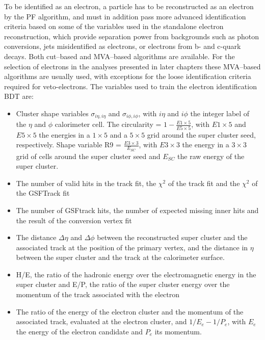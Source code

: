 To be identified as an electron, a particle has to be reconstructed as
an electron by the \ac{PF} algorithm, and must in addition pass
more advanced identification criteria based on some of the variables used in the
standalone electron reconstruction, which provide separation power from backgrounds
such as photon conversions, jets misidentified as electrons, or electrons from b- and c-quark
decays. Both cut--based and MVA--based algorithms are available. For the selection of electrons in 
the analyses presented in later chapters these MVA--based algorithms are usually used, 
with exceptions for the loose identification criteria required for veto-electrons. 
The variables used to train the electron identification BDT are:

\begin{itemize}
\setlength{\itemsep}{-\baselineskip}
\item Cluster shape variables $\sigma_{i\eta,i\eta}$ and $\sigma_{i\phi,i\phi}$, with $i\eta$ and $i\phi$ the integer
label of the $\eta$ and $\phi$ calorimeter cell. The circularity =  $1 -\frac{E1\times5}{E5\times5}$, with
$E1\times5$ and $E5\times5$ the energies in a $1\times5$ and a $5\times5$ grid around the super cluster seed,
respectively. Shape variable R9 = $\frac{E3\times3}{E_{SC}}$, with $E3\times3$ the energy in a $3\times3$ grid
of cells around the super cluster seed and $E_{SC}$ the raw energy of the super cluster.
\item The number of valid hits in the track fit, the $\chi^2$ of the track fit and the $\chi^2$ of the GSFTrack fit
\item The number of GSFtrack hits, the number of expected missing inner hits and the result of the conversion vertex fit
\item The distance $\Delta \eta$ and $\Delta \phi$ between the reconstructed super cluster and the associated track at the position of the primary vertex, and the distance in $\eta$ between the super cluster and the track at the calorimeter surface.
\item H/E, the ratio of the hadronic energy over the electromagnetic energy in the super cluster and E/P, the ratio of the super cluster energy over the momentum of the track associated with the electron
\item The ratio of the energy of the electron cluster and the momentum of the associated track, evaluated at the electron cluster,
 and $1/E_e - 1/P_e$, with $E_e$ the energy of the electron candidate and $P_e$ its momentum.
\end{itemize}

